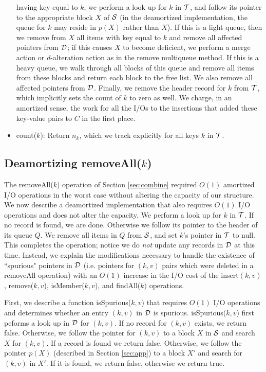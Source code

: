 \documentclass[11pt,letterpaper]{article}
\begin{document}
\begin{itemize}
having key equal to $k$, we perform a look up for $k$ in $\cal T$,
and follow its pointer to the appropriate block $X$ of $\cal S$ (in the deamortized implementation,
the queue for $k$ may reside in $p(X)$ rather than $X$). If this
is a light queue, then we remove from $X$ all items with key equal to
$k$ and remove all affected pointers from $\cal D$; if this causes $X$ to become deficient, we 
perform a merge action or $d$-alteration action as in the remove multiqueue method. If
this is a heavy queue, we walk through all blocks of this queue and remove all items from these blocks and
return each block to the free list. We also remove all affected pointers from $\cal D$. 
Finally, we remove the header record for $k$ from $\cal T$, which implicitly sets the count of $k$ to zero as well. We charge, in an amortized sense,
the work for all the I/Os to the insertions that added these
key-value pairs to $C$ in the first place.
\item count($k$): Return $n_k$, which we track explicitly for all keys $k$ in $\cal T$.
\end{itemize}

\subsection{Deamortizing removeAll($k$)}
\label{sec:removeall}
The removeAll($k$) operation of Section \ref{sec:combine} required $O(1)$ amortized I/O operations in the worst case without altering the capacity of our structure.
We now describe a deamortized implementation that also requires $O(1)$ I/O operations and does not alter the capacity. We perform a look up for $k$ in $\cal T$. If no record 
is found, we are done. Otherwise we follow its pointer to the header of its queue $Q$. We remove all items in $Q$ from $\cal S$, and set $k$'s pointer in $\cal T$ to null. This completes
the operation; notice we do \emph{not}
update any records in $\cal D$ at this time. Instead, we explain the modifications necessary to handle the existence of ``spurious" pointers in $\cal D$ (i.e. pointers for $(k, v)$ pairs which were deleted in a removeAll operation) with an $O(1)$ increase in the I/O cost of the insert$(k,v)$, remove($k, v$), isMember($k, v$), and findAll($k)$ operations.

First, we describe a function isSpurious($k,v$) that requires $O(1)$ I/O operations and determines whether an entry $(k,v)$ in $\cal D$ is spurious. 
isSpurious($k,v$) first peforms a look up in $\cal D$ for $(k, v)$. If no record for $(k, v)$ exists, we return false. Otherwise, we follow the pointer for $(k, v)$ to a block $X$ in $\cal S$ and search $X$ for $(k, v)$. If a record is found we return false.
Otherwise, we follow the pointer $p(X)$ (described in Section \ref{sec:app}) to a block $X'$ and search for $(k, v)$ in $X'$.  If it is found,
we return false, otherwise we return true. 
\end{document}
